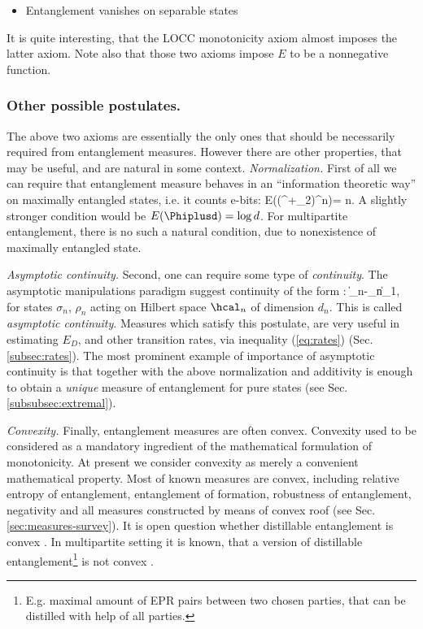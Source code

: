 \documentclass[twocolumn,aps,rmp]{revtex4}
\begin{document}
\begin{itemize}
    \item  Entanglement vanishes on separable states
\end{itemize}


It is quite interesting, that the LOCC monotonicity axiom
almost imposes the latter axiom. Note also that those two axioms impose
$E$ to be a nonnegative function.



\subsubsection{Other  possible postulates.}
\label{sec:other-post}
The above two axioms are essentially the only
ones that should be necessarily required from entanglement measures. However there are other
properties, that may be useful, and are natural in some context.
{\it Normalization.}
First of all
we can require that entanglement  measure behaves in an ``information theoretic
way'' on maximally entangled states, i.e. it counts e-bits:
\be
E((\Phi^+_2)^{\ot n})= n.
\ee
A slightly stronger condition would be $E(\Phiplusd)=\log d$.
For multipartite entanglement, there is no such a natural condition,
due to nonexistence of maximally entangled state.

{\it Asymptotic continuity.}
Second, one can require some type of {\it continuity}. The asymptotic manipulations
paradigm suggest continuity of the form \cite{Vidal-mon2000,limits,DonaldHR2001}:
\be
\|\rho_n-\sigma_n\|_1\quad \Rightarrow {},
\ee
for states $\sigma_n$, $\rho_n$ acting on Hilbert space $\hcal_n$ of dimension $d_n$.
This is called {\it asymptotic continuity}. Measures which satisfy this postulate,
are very useful in estimating $E_D$, and other transition rates, via inequality
(\ref{eq:rates}) (Sec. \ref{subsec:rates}). The most prominent
example of importance of asymptotic continuity is that together with the above normalization and additivity is enough to obtain a {\it unique} measure
of entanglement for pure states (see Sec. \ref{subsubsec:extremal}).



{\it Convexity.}
Finally, entanglement measures are often convex. Convexity used to
be considered as a mandatory ingredient of the mathematical
formulation of monotonicity. At present we consider convexity as
merely a convenient mathematical property.
Most of known measures are convex, including relative entropy of
entanglement, entanglement of formation, robustness of entanglement,
negativity and  all measures constructed by means of convex
roof (see Sec. \ref{sec:measures-survey}). It is open question whether
distillable entanglement is convex \cite{ShorST2001}.
In multipartite setting it is known, that a version of distillable entanglement\footnote{E.g. maximal amount of EPR pairs between two chosen parties,
that can be distilled with help of all parties.} is not convex \cite{ShorST-superactiv}.
\end{document}
